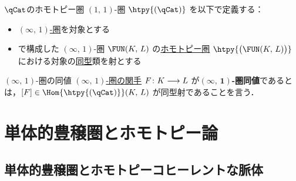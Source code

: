\documentclass[TQFT_main]{subfiles}
\begin{document}
\begin{mydef}[label=def:hqCat]{{$\qCat$}のホモトピー圏}
    $(1,\, 1)$-圏 $\htpy{(\qCat)}$ を以下で定義する：
    \begin{itemize}
        \item \hyperref[def:infinity-1]{$(\infty,\, 1)$-圏}を対象とする
        \item {}で構成した $(\infty,\, 1)$-圏 $\FUN(K,\, L)$ の\hyperref[def:hcat-infty]{ホモトピー圏} $\htpy{\bigl(\FUN(K,\, L)\bigr)}$ における対象の\hyperref[def:iso]{同型}類を射とする
    \end{itemize}
\end{mydef}

\begin{mydef}[label=def:equiv-infty]{{$(\infty,\, 1)$}-圏の同値}
    \hyperref[def:infinity-1]{$(\infty,\, 1)$-圏の関手} $F \colon K \longrightarrow L$ が\textbf{$\bm{(\infty,\, 1)}$-圏同値}であるとは，$[F] \in \Hom{\htpy{(\qCat)}}(K,\, L)$ が同型射であることを言う．
\end{mydef}



\section{単体的豊穣圏とホモトピー論}

\subsection{単体的豊穣圏とホモトピーコヒーレントな脈体}
\end{document}

